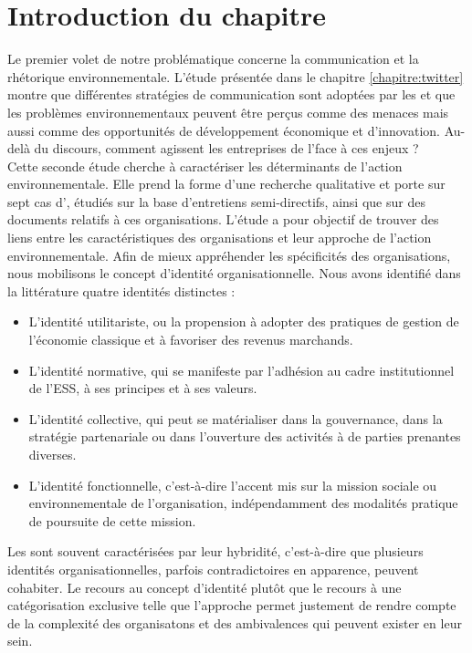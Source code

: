 

\section*{Introduction du chapitre}


Le premier volet de notre problématique concerne la communication et la rhétorique environnementale. L'étude présentée dans le chapitre \ref{chapitre:twitter} montre que différentes stratégies de communication sont adoptées par les \oess et que les problèmes environnementaux peuvent être perçus comme des menaces mais aussi comme des opportunités de développement économique et d'innovation. Au-delà du discours, comment agissent les entreprises de l'\ess face à ces enjeux ? \\

 Cette seconde étude cherche à caractériser les déterminants de l'action environnementale. Elle prend la forme d'une recherche qualitative et porte sur sept cas d'\eess, étudiés sur la base d'entretiens semi-directifs, ainsi que sur des documents relatifs à ces organisations. L'étude a pour objectif de trouver des liens entre les caractéristiques des organisations et leur approche de l'action environnementale. Afin de mieux appréhender les spécificités des organisations, nous mobilisons le concept d'identité organisationnelle. Nous avons identifié dans la littérature quatre identités distinctes : \\
 \begin{itemize}
     \item L'identité utilitariste, ou la propension à adopter des pratiques de gestion de l'économie classique et à favoriser des revenus marchands.
     \item L'identité normative, qui se manifeste par l'adhésion au cadre institutionnel de l'ESS, à ses principes et à ses valeurs.
     \item L'identité collective, qui peut se matérialiser dans la gouvernance, dans la stratégie partenariale ou dans l'ouverture des activités à de parties prenantes diverses.
     \item L'identité fonctionnelle, c'est-à-dire l'accent mis sur la mission sociale ou environnementale de l'organisation, indépendamment des modalités pratique de poursuite de cette mission.\\
 \end{itemize}

 Les \eess sont souvent caractérisées par leur hybridité, c'est-à-dire que plusieurs identités organisationnelles, parfois contradictoires en apparence, peuvent cohabiter. Le recours au concept d'identité plutôt que le recours à une catégorisation exclusive telle que l'approche  permet justement de rendre compte de la complexité des organisatons et des ambivalences qui peuvent exister en leur sein. \\

